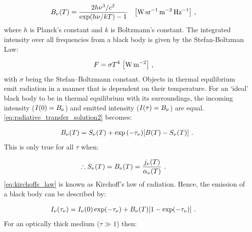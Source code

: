 \begin{equation}
	\begin{aligned}
		B_\nu\qty(T)&= \frac{2h\nu^3/c^2}{\exp(h\nu/kT)-1}\quad\qty[\si{\watt\per\steradian\per\meter\squared\per\hertz}] \text{ ,}
	\end{aligned}
\end{equation}
\noindent  where $h$ is Planck's constant and $k$ is Boltzmann's constant. The integrated intensity over all frequencies from a black body is given by the Stefan-Boltzman Law:

\begin{equation}
	\begin{aligned}
		F&=\sigma T^4~\qty[\si{\watt\per\meter\squared}]\text{ ,}
	\end{aligned}
\end{equation}
\noindent with $\sigma$ being the Stefan–Boltzmann constant. Objects in thermal equilibrium emit radiation in a manner that is dependent on their temperature. For an `ideal' black body to be in thermal equilibrium with its surroundings, the incoming intensity ($I\qty(0)=B_\nu$) and emitted intensity ($I\qty(\tau)=B_\nu$) are equal. \autoref{eq:radiative_transfer_solution2} becomes:

\begin{equation}
    \begin{aligned}
        B_\nu\qty(T)&=S_\nu\qty(T) + \exp\qty(-\tau_\nu)\qty[B\qty(T)-S_\nu\qty(T)] \text{ .}\\
    \end{aligned}
\end{equation}
\noindent This is only true for all $\tau$ when:

\begin{equation}
    \begin{aligned}
    	\therefore S_\nu\qty(T) &= B_\nu\qty(T)=\frac{j_\nu\qty(T)}{\alpha_\nu\qty(T)}\text{ .}
    \end{aligned} \label{eq:kirchoffs_law}
    \end{equation}
\noindent \autoref{eq:kirchoffs_law} is known as Kirchoff's law of radiation. Hence, the emission of a black body can be described by:

\begin{equation}
    \begin{aligned}
        I_\nu\qty(\tau_\nu)&=I_\nu\qty(0)\exp(-\tau_\nu)+B_\nu\qty(T)\qty[1-\exp(-\tau_\nu)]\text{ .}
    \end{aligned} \label{eq:chapter_6_black_body_emission}
\end{equation}
\noindent For an optically thick medium ($\tau\gg 1$) then:

